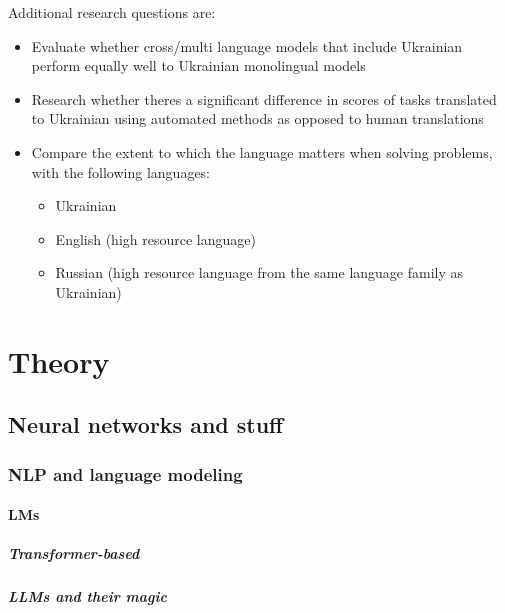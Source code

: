 Additional research questions are:

\begin{itemize}
\tightlist
\item
  Evaluate whether cross/multi language models that include Ukrainian
  perform equally well to Ukrainian monolingual models
\item
  Research whether there\textquotesingle s a significant difference in
  scores of tasks translated to Ukrainian using automated methods as
  opposed to human translations
\item
  Compare the extent to which the language matters when solving
  problems, with the following languages:

  \begin{itemize}
  \tightlist
  \item
    Ukrainian
  \item
    English (high resource language)
  \item
    Russian (high resource language from the same language family as
    Ukrainian)
  \end{itemize}
\end{itemize}

\chapter{Theory}\label{theory}

\section{Neural networks and stuff}\label{neural-networks-and-stuff}

\subsection{NLP and language modeling}\label{nlp-and-language-modeling}

\subsubsection{LMs}\label{lms}

\paragraph{Transformer-based}\label{transformer-based}

\paragraph{LLMs and their magic}\label{llms-and-their-magic}

